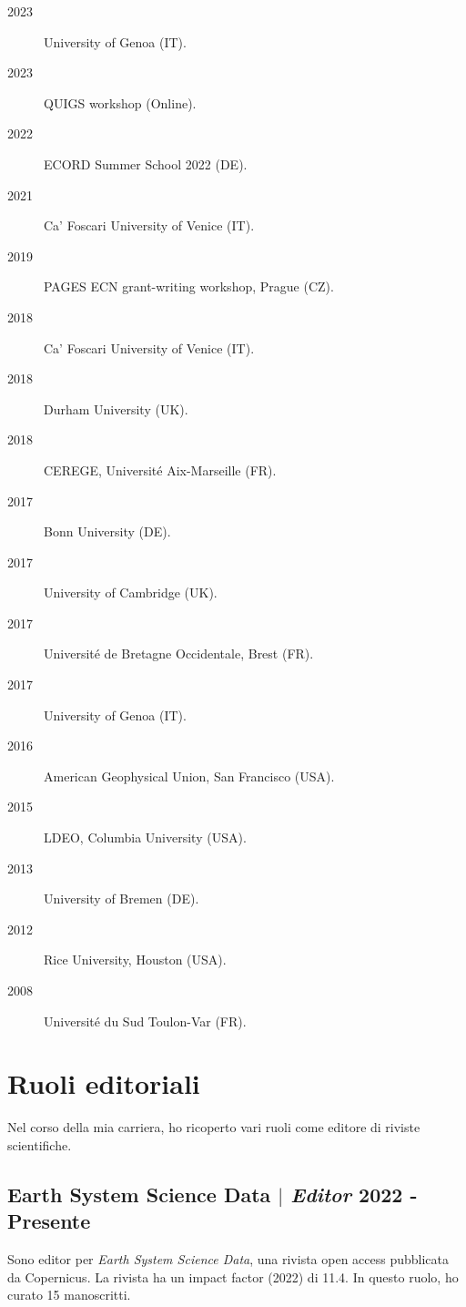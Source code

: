 \documentclass[11pt]{article}
\begin{document}
{\footnotesize 
\begin{description}
  \item [2023] University of Genoa (IT).
  \item [2023] QUIGS workshop (Online).
  \item [2022] ECORD Summer School 2022 (DE).
  \item [2021] Ca’ Foscari University of Venice (IT).
  \item [2019] PAGES ECN grant-writing workshop, Prague (CZ).
  \item [2018] Ca’ Foscari University of Venice (IT).
  \item [2018] Durham University (UK).
  \item [2018] CEREGE, Université Aix-Marseille (FR).
  \item [2017] Bonn University (DE).
  \item [2017] University of Cambridge (UK).
  \item [2017] Université de Bretagne Occidentale, Brest (FR).
  \item [2017] University of Genoa (IT).
  \item [2016] American Geophysical Union, San Francisco (USA).
  \item [2015] LDEO, Columbia University (USA).
  \item [2013] University of Bremen (DE).
  \item [2012] Rice University, Houston (USA).
  \item [2008] Université du Sud Toulon-Var (FR).
\end{description}
}
\newpage

\section{Ruoli editoriali}
{\normalfont Nel corso della mia carriera, ho ricoperto vari ruoli come editore di riviste scientifiche.}\\

\bigskip

\subsection{Earth System Science Data $|$ {\normalfont\textit{Editor}} \hfill 2022 - Presente}
{\footnotesize Sono editor per \textit{Earth System Science Data}, una rivista open access pubblicata da Copernicus. La rivista ha un impact factor (2022) di 11.4. In questo ruolo, ho curato 15 manoscritti.}
\bigskip
\end{document}
